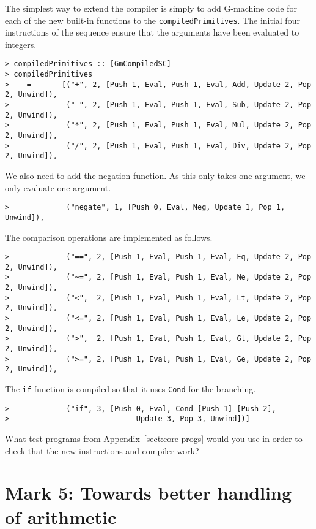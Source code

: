 The simplest way to extend the compiler is simply to add G-machine
code for each of the new built-in functions to the
\mbox{\tt compiledPrimitives}.  The initial four instructions of the sequence
ensure that the arguments have been evaluated to integers.
\begin{verbatim}
> compiledPrimitives :: [GmCompiledSC]
> compiledPrimitives
>    =       [("+", 2, [Push 1, Eval, Push 1, Eval, Add, Update 2, Pop 2, Unwind]),
>             ("-", 2, [Push 1, Eval, Push 1, Eval, Sub, Update 2, Pop 2, Unwind]),
>             ("*", 2, [Push 1, Eval, Push 1, Eval, Mul, Update 2, Pop 2, Unwind]),
>             ("/", 2, [Push 1, Eval, Push 1, Eval, Div, Update 2, Pop 2, Unwind]),
\end{verbatim}
%
We also need to add the negation function. As this only takes one
argument, we only evaluate one argument.
\begin{verbatim}
>             ("negate", 1, [Push 0, Eval, Neg, Update 1, Pop 1, Unwind]),
\end{verbatim}
\par
The comparison operations are implemented as follows.
\begin{verbatim}
>             ("==", 2, [Push 1, Eval, Push 1, Eval, Eq, Update 2, Pop 2, Unwind]),
>             ("~=", 2, [Push 1, Eval, Push 1, Eval, Ne, Update 2, Pop 2, Unwind]),
>             ("<",  2, [Push 1, Eval, Push 1, Eval, Lt, Update 2, Pop 2, Unwind]),
>             ("<=", 2, [Push 1, Eval, Push 1, Eval, Le, Update 2, Pop 2, Unwind]),
>             (">",  2, [Push 1, Eval, Push 1, Eval, Gt, Update 2, Pop 2, Unwind]),
>             (">=", 2, [Push 1, Eval, Push 1, Eval, Ge, Update 2, Pop 2, Unwind]),
\end{verbatim}
The \mbox{\tt if} function is compiled so that it uses \mbox{\tt Cond} for the
branching.
\begin{verbatim}
>             ("if", 3, [Push 0, Eval, Cond [Push 1] [Push 2],
>                             Update 3, Pop 3, Unwind])]
\end{verbatim}
\begin{exercise}\label{gm:X:tests4}
What test programs from Appendix~\ref{sect:core-progs} would you use
in order to check that the new instructions and compiler work?
\end{exercise}

\section{Mark 5: Towards better handling of
arithmetic} \label{gm:ss:Escheme}

